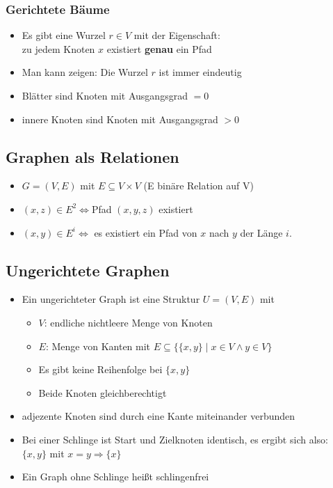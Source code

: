 \documentclass{article}
\newcommand{\strongColor}[1]{\textcolor{strongColor}{#1}}
\newcommand{\strong}[1]{\textbf{\strongColor{#1}}}
\newcommand{\important}[1]{\textcolor{importantColor}{#1}}
\newcommand{\set}[1]{\{#1\}}
\begin{document}
\subsubsection{Gerichtete Bäume}
\begin{itemize}
    \item Es gibt eine \important{Wurzel $r \in V$} mit der Eigenschaft:\\
    \important{zu jedem Knoten $x$} existiert \important{\strong{genau} ein Pfad}
    \item Man kann zeigen: Die Wurzel $r$ ist immer eindeutig
    \item \important{Blätter} sind Knoten mit Ausgangsgrad $=0$
    \item \important{innere Knoten} sind Knoten mit Ausgangsgrad $>0$
\end{itemize}

\subsection{Graphen als Relationen}
\begin{itemize}
    \item $G=(V,E)$ mit $E\subseteq V\times V$ (E binäre Relation auf V)
    \item $(x,z)\in E^2 \iff $Pfad $(x,y,z)$ existiert
    \item $(x,y) \in E^i \iff$ es existiert ein Pfad von $x$ nach $y$ der Länge $i$.
\end{itemize}

\subsection{Ungerichtete Graphen}
\begin{itemize}
    \item Ein \important{ungerichteter Graph} ist eine Struktur $U=(V,E)$ mit
    \begin{itemize}
        \item $V$: endliche nichtleere Menge von \important{Knoten}
        \item $E$: Menge von \important{Kanten} mit $E\subseteq \set{\set{x,y}\mid x\in V \land y\in V}$
        \item Es gibt keine Reihenfolge bei $\set{x,y}$
        \item Beide Knoten gleichberechtigt
    \end{itemize}
    \item \important{adjezente Knoten} sind durch eine Kante miteinander verbunden
    \item Bei einer \important{Schlinge} ist Start und Zielknoten identisch, es ergibt sich also:\\
    $\set{x,y}$ mit $x=y \Rightarrow\set{x}$
    \item Ein Graph ohne Schlinge heißt \important{schlingenfrei}
\end{itemize}
\end{document}
